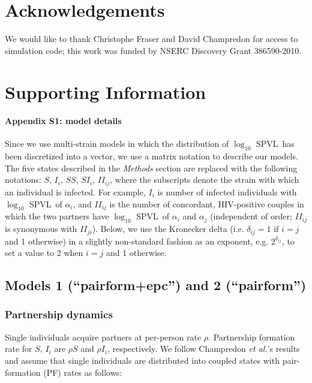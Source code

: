 \documentclass[10pt,letterpaper]{article}
\newcommand{\Lspvl}{$\log_{10}$ SPVL}
\newcommand{\etal}{\textit{et al.}}
\begin{document}
\section*{Acknowledgements}
We would like to thank Christophe Fraser and
David Champredon for access to simulation code;
this work was funded by NSERC Discovery Grant 386590-2010.


\section*{Supporting Information}

\paragraph*{Appendix S1: model details}
\label{S1_Appendix}

Since we use multi-strain models in which the distribution of \Lspvl\ has been discretized into a vector, we use a matrix notation to describe our models. The five states described in the \emph{Methods} section are replaced with the following notations: $S$, $I_i$, $SS$, $SI_i$, $II_{ij}$, where the subscripts denote the strain with which an individual is infected. For example, $I_i$ is number of infected individuals with \Lspvl\ of $\alpha_i$, and $II_{ij}$ is the number of concordant, HIV-positive couples in which the two partners have \Lspvl\ of $\alpha_i$ and $\alpha_j$ (independent of order; $II_{ij}$ is synonymous with $II_{ji}$). 
Below, we use the Kronecker delta (i.e. $\delta_{ij}=1$ if $i=j$ and 1 otherwise) in a slightly non-standard fashion as an exponent, e.g. $2^{\delta_{ij}}$, to set a value to 2 when $i=j$ and 1 otherwise.

\subsection*{Models 1 (``pairform+epc'') and 2 (``pairform'')}

\subsubsection*{Partnership dynamics}

Single individuals acquire partners at per-person rate $\rho$. Partnership formation rate for $S$, $I_i$ are $\rho S$ and $\rho I_i$, respectively. We follow Champredon \etal's results \cite{champredon_hiv_2013} and assume that single individuals are distributed into coupled states with pair-formation (PF) rates as follows:
\end{document}
